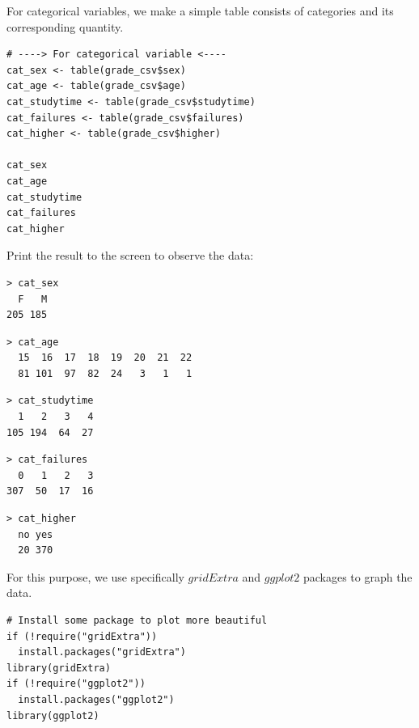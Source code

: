 \documentclass[a4paper]{article}
\newcounter{subsubsubsection}[subsubsection]
\numberwithin{equation}{section}
\begin{document}
For categorical variables, we make a simple table consists of categories and its corresponding quantity.
\begin{mdframed}[leftline=false,rightline=false,backgroundcolor=magenta!10,nobreak=true]
  \begin{verbatim}
# ----> For categorical variable <----
cat_sex <- table(grade_csv$sex)
cat_age <- table(grade_csv$age)
cat_studytime <- table(grade_csv$studytime)
cat_failures <- table(grade_csv$failures)
cat_higher <- table(grade_csv$higher)

cat_sex
cat_age
cat_studytime
cat_failures
cat_higher
  \end{verbatim}
\end{mdframed}

Print the result to the screen to observe the data:
\begin{mdframed}[leftline=false,rightline=false,backgroundcolor=gray!10,nobreak=true]
  \begin{verbatim}
> cat_sex
  F   M
205 185
  \end{verbatim}
  \begin{verbatim}
> cat_age
  15  16  17  18  19  20  21  22
  81 101  97  82  24   3   1   1
  \end{verbatim}
  \begin{verbatim}
> cat_studytime
  1   2   3   4
105 194  64  27
  \end{verbatim}
  \begin{verbatim}
> cat_failures
  0   1   2   3
307  50  17  16
  \end{verbatim}
  \begin{verbatim}
> cat_higher
  no yes
  20 370
  \end{verbatim}
\end{mdframed}

For this purpose, we use specifically \(gridExtra\) and \(ggplot2\) packages to graph the data.

\begin{mdframed}[leftline=false,rightline=false,backgroundcolor=magenta!10,nobreak=true]
  \begin{verbatim}
# Install some package to plot more beautiful
if (!require("gridExtra"))
  install.packages("gridExtra")
library(gridExtra)
if (!require("ggplot2"))
  install.packages("ggplot2")
library(ggplot2)
  \end{verbatim}
\end{mdframed}
\end{document}
